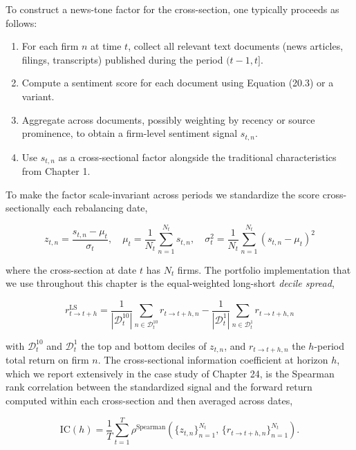 To construct a news-tone factor for the cross-section, one typically proceeds as follows:

\begin{enumerate}
\item For each firm $n$ at time $t$, collect all relevant text documents (news articles, filings, transcripts) published during the period $(t -1, t]$.
\item Compute a sentiment score for each document using Equation (20.3) or a variant.
\item Aggregate across documents, possibly weighting by recency or source prominence, to obtain a firm-level sentiment signal $s_{t,n}$.
\item Use $s_{t,n}$ as a cross-sectional factor alongside the traditional characteristics from Chapter 1.
\end{enumerate}

To make the factor scale-invariant across periods we standardize the score cross-sectionally each rebalancing date,

\begin{equation}
z_{t,n} = \frac{s_{t,n} - \mu_t}{\sigma_t}, \quad \mu_t = \frac{1}{N_t}\sum_{n=1}^{N_t} s_{t,n}, \quad \sigma_t^2 = \frac{1}{N_t}\sum_{n=1}^{N_t} (s_{t,n} - \mu_t)^2
\tag{20.4}
\end{equation}

where the cross-section at date $t$ has $N_t$ firms. The portfolio implementation that we use throughout this chapter is the equal-weighted long-short \textit{decile spread},

\begin{equation}
r^{\text{LS}}_{t \to t+h} = \frac{1}{|\mathcal{D}_t^{10}|}\sum_{n \in \mathcal{D}_t^{10}} r_{t \to t+h, n} - \frac{1}{|\mathcal{D}_t^{1}|}\sum_{n \in \mathcal{D}_t^{1}} r_{t \to t+h, n}
\tag{20.5}
\end{equation}

with $\mathcal{D}_t^{10}$ and $\mathcal{D}_t^{1}$ the top and bottom deciles of $z_{t,n}$, and $r_{t \to t+h, n}$ the $h$-period total return on firm $n$. The cross-sectional information coefficient at horizon $h$, which we report extensively in the case study of Chapter 24, is the Spearman rank correlation between the standardized signal and the forward return computed within each cross-section and then averaged across dates,

\begin{equation}
\text{IC}(h) = \frac{1}{T}\sum_{t=1}^{T} \rho^{\text{Spearman}}\!\left(\{z_{t,n}\}_{n=1}^{N_t},\, \{r_{t \to t+h, n}\}_{n=1}^{N_t}\right).
\tag{20.6}
\end{equation}

